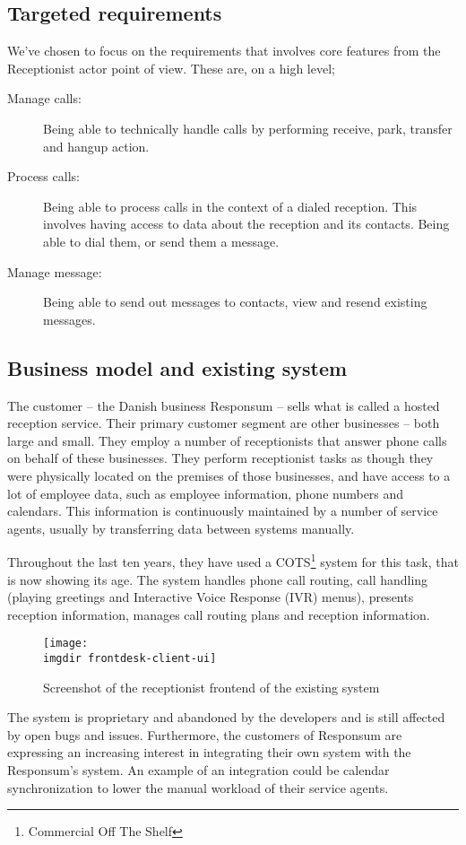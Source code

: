 \subsection{Targeted requirements}
We've chosen to focus on the requirements that involves core features from the Receptionist actor point of view. These are, on a high level;
\begin{description}
  \item[Manage calls:] Being able to technically handle calls by performing receive, park, transfer and hangup action.
  \item[Process calls:] Being able to process calls in the context of a dialed reception. This involves having access to data about the reception and its contacts. Being able to dial them, or send them a message.
  \item[Manage message:] Being able to send out messages to contacts, view and resend existing messages.
\end{description}

\subsection{Business model and existing system}
The customer -- the Danish business Responsum -- sells what is called a hosted reception service. Their primary customer segment are other businesses -- both large and small. They employ a number of receptionists that answer phone calls on behalf of these businesses. They perform receptionist tasks as though they were physically located on the premises of those businesses, and have access to a lot of employee data, such as employee information, phone numbers and calendars. This information is continuously maintained by a number of service agents, usually by transferring data between systems manually.\medskip

\noindent Throughout the last ten years, they have used a COTS\footnote{Commercial Off The Shelf} system for this task, that is now showing its age. The system handles phone call routing, call handling (playing greetings and Interactive Voice Response (IVR) menus), presents reception information, manages call routing plans and reception information.
\begin{figure}[!hbpt]
\centering
\texttt{[image: \\imgdir frontdesk-client-ui]}
\caption{Screenshot of the receptionist frontend of the existing system}
\label{fig:frontdesk_screenshot}
\end{figure}
The system is proprietary and abandoned by the developers and is still affected by open bugs and issues. Furthermore, the customers of Responsum are expressing an increasing interest in integrating their own system with the Responsum's system. An example of an integration could be calendar synchronization to lower the manual workload of their service agents.

